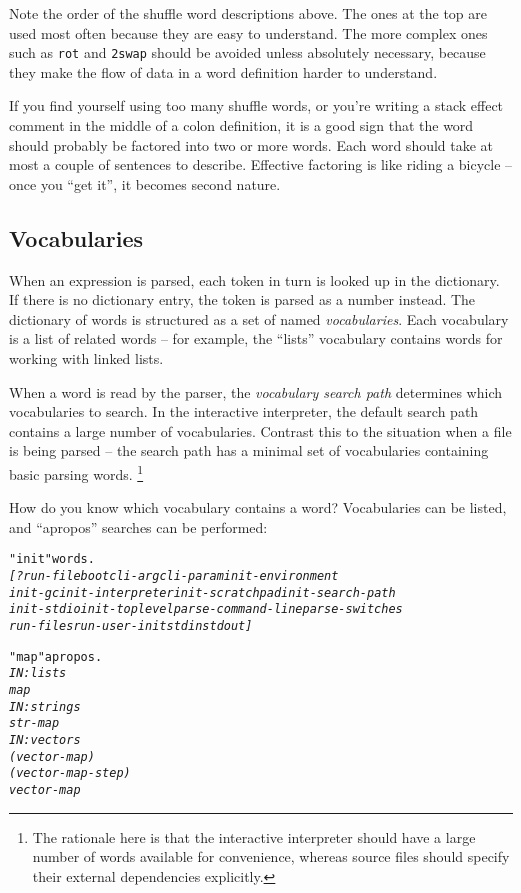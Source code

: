 \documentclass[english]{article}
\begin{document}
Note the order of the shuffle word descriptions above. The ones at
the top are used most often because they are easy to understand. The
more complex ones such as \texttt{rot} and \texttt{2swap} should be avoided unless absolutely necessary, because
they make the flow of data in a word definition harder to understand.

If you find yourself using too many shuffle words, or you're writing
a stack effect comment in the middle of a colon definition, it is
a good sign that the word should probably be factored into two or
more words. Each word should take at most a couple of sentences to describe. Effective factoring is like riding a bicycle -- once you ``get it'', it becomes second nature.


\subsection{Vocabularies}

When an expression is parsed, each token in turn is looked up in the dictionary. If there is no dictionary entry, the token is parsed as a number instead.
The dictionary of words is structured as a set of named \emph{vocabularies}. Each vocabulary is a list
of related words -- for example, the {}``lists''
vocabulary contains words for working with linked lists.

When a word is read by the parser, the \emph{vocabulary search path}
determines which vocabularies to search. In the interactive interpreter,
the default search path contains a large number of vocabularies. Contrast
this to the situation when a file is being parsed -- the search path
has a minimal set of vocabularies containing basic parsing words.%
\footnote{The rationale here is that the interactive interpreter should have
a large number of words available for convenience, whereas
source files should specify their external dependencies explicitly.%
}

How do you know which vocabulary contains a word? Vocabularies can
be listed, and ``apropos'' searches can be performed:

\begin{alltt}
"init" words.
\emph{{[} ?run-file boot cli-arg cli-param init-environment}
\emph{init-gc init-interpreter init-scratchpad init-search-path}
\emph{init-stdio init-toplevel parse-command-line parse-switches}
\emph{run-files run-user-init stdin stdout {]} }

"map" apropos.
\emph{IN: lists}
\emph{map}
\emph{IN: strings}
\emph{str-map}
\emph{IN: vectors}
\emph{(vector-map)}
\emph{(vector-map-step)}
\emph{vector-map }
\end{alltt}
\end{document}
